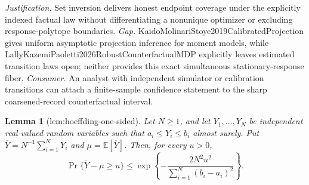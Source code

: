 \documentclass{article}
\newtheorem{lemma}{Lemma}
\begin{document}
\par\smallskip\noindent \textit{Justification.} Set inversion delivers honest endpoint coverage under the explicitly indexed factual law without differentiating a nonunique optimizer or excluding response-polytope boundaries. \textit{Gap.} KaidoMolinariStoye2019CalibratedProjection gives uniform asymptotic projection inference for moment models, while LallyKazemiPaoletti2026RobustCounterfactualMDP explicitly leaves estimated transition laws open; neither provides this exact simultaneous stationary-response fiber. \textit{Consumer.} An analyst with independent simulator or calibration transitions can attach a finite-sample confidence statement to the sharp coarsened-record counterfactual interval.

\begin{lemma}[lem:hoeffding-one-sided]\label{lem:hoeffding-one-sided}
Let \(N\ge 1\), and let \(Y_1,\ldots,Y_N\) be independent real-valued random variables such that \(a_i\le Y_i\le b_i\) almost surely.  Put \(\overline Y=N^{-1}\sum_{i=1}^N Y_i\) and \(\mu=\mathbb E[\overline Y]\).  Then, for every \(u>0\),
\[
 \Pr\{\overline Y-\mu\ge u\}
 \le
 \exp\!\left\{-\frac{2N^2u^2}{\sum_{i=1}^N(b_i-a_i)^2}\right\}.
\]
\end{lemma}
\end{document}
